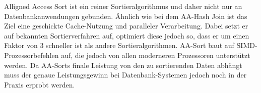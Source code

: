 Alligned Access Sort ist ein reiner Sortieralgorithmus und daher nicht nur an Datenbankanwendungen gebunden. Ähnlich wie bei dem AA-Hash Join ist das Ziel eine geschickte Cache-Nutzung und paralleler Verarbeitung. Dabei setzt er auf bekannten Sortierverfahren auf, optimiert diese jedoch so, dass er um einen Faktor von 3 schneller ist als andere Sortieralgorithmen. AA-Sort baut auf SIMD-Prozessorbefehlen auf, die jedoch von allen moderneren Prozessoren unterstützt werden. Da AA-Sorts finale Leistung von den zu sortierenden Daten abhängt muss der genaue Leistungsgewinn bei Datenbank-Systemen jedoch noch in der Praxis erprobt werden.
